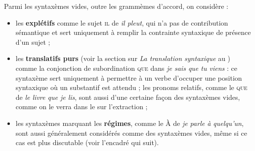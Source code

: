 Parmi les syntaxèmes vides, outre les grammèmes d’accord, on considère :

\begin{itemize}
\item les \textbf{explétifs} comme le sujet \textsc{il} de \textit{il pleut}, qui n’a pas de contribution sémantique et sert uniquement à remplir la contrainte syntaxique de présence d’un sujet ;
\item les \textbf{translatifs purs} (voir la section sur \textit{La translation syntaxique} au ) comme la conjonction de subordination \textsc{que} dans \textit{je sais que tu viens} : ce syntaxème sert uniquement à permettre à un verbe d’occuper une position syntaxique où un substantif est attendu ; les pronoms relatifs, comme le \textsc{que} de \textit{le livre que je lis}, sont aussi d’une certaine façon des syntaxèmes vides, comme on le verra dans le  sur l’extraction ;
\item les syntaxèmes marquant les \textbf{régimes}, comme le À de \textit{je parle à quelqu’un}, sont aussi généralement considérés comme des syntaxèmes vides, même si ce cas est plus discutable (voir l’encadré qui suit).
\end{itemize}

